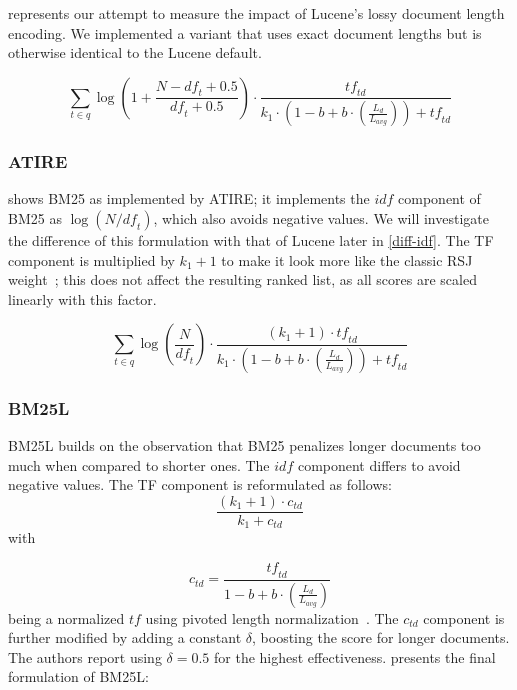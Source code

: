  represents our attempt to measure the impact of Lucene’s lossy document length encoding. We implemented a variant that uses exact document lengths but is otherwise identical to the Lucene default.

\begin{equation}
	\label{lucene-accurate}
	\sum_{t\in q}\log\left(1 + \frac{N-\mathit{df}_t+0.5}{\mathit{df}_t+0.5}\right)\cdot\frac{\mathit{tf}_{\mathit{td}}}{k_1\cdot \left(1-b+b\cdot\left(\frac{L_d}{L_{\mathit{avg}}}\right)\right)+\mathit{tf}_{\mathit{td}}}
\end{equation}

\subsubsection{ATIRE~\citep{ATIRE}}
 shows BM25 as implemented by ATIRE; it implements the $\mathit{idf}$ component of BM25 as $\log(N/\mathit{df}_{t})$, which also avoids negative values. We will investigate the difference of this formulation with that of Lucene later in \cref{diff-idf}. The TF component is multiplied by $k_1+1$ to make it look more like the classic RSJ weight~\citep{RSJ}; this does not affect the resulting ranked list, as all scores are scaled linearly with this factor.

\begin{equation}
	\label{atire-variant}
	\sum_{t\in q}\log\left(\frac{N}{\mathit{df}_t}\right)\cdot\frac{\left(k_1 + 1\right)\cdot \mathit{tf}_{\mathit{td}}}{k_1\cdot\left(1-b+b\cdot\left(\frac{L_{d}}{L_{\mathit{avg}}}\right)\right)+\mathit{tf}_{\mathit{td}}}
\end{equation}

\subsubsection{BM25L~\citep{bm25l}}
BM25L builds on the observation that BM25 penalizes longer documents too much when compared to shorter ones. The $\mathit{idf}$ component differs to avoid negative values. The TF component is reformulated as follows:
\begin{equation}
	\frac{\left(k_1+1\right)\cdot c_{\mathit{td}}}{k_1+c_{\mathit{td}}}  
\end{equation}
with 

\begin{equation}
	c_{\mathit{td}} = \frac{\mathit{tf}_{\mathit{td}}}{1 - b + b \cdot \left(\frac{L_d}{L_{\mathit{avg}}}\right)}  
\end{equation}
being a normalized $tf$ using pivoted length normalization~\citep{ctd}.
The $c_{td}$ component is further modified by adding a constant $\delta$, boosting the score for longer documents. The authors report using $\delta = 0.5$ for the highest effectiveness.  presents the final formulation of BM25L:

